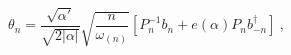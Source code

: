 \begin{equation}
\theta_{n}= \frac{\sqrt{\alpha'}}{\sqrt{2 |\alpha|}} 
\sqrt{\frac{n}{\omega_{(n)}}} 
\left[ P^{-1}_n b_n + e(\alpha) P_n b_{-n}^{\dagger} \right]~,
\label{Pthnsv}
\end{equation}

